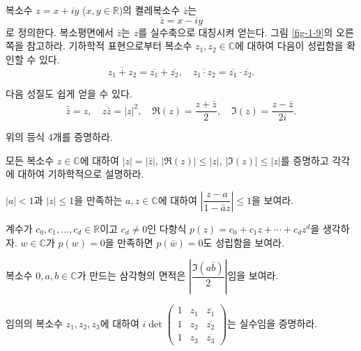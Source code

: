 복소수 $z=x+iy$ ($x,y\in\mathbb R$)의 켤레복소수 $\bar z$는
$$
\bar z = x - iy
$$
로 정의한다.
복소평면에서 $\bar z$는 $z$를 실수축으로 대칭시켜 얻는다.
그림 \ref{fig-1-9}의 오른쪽을 참고하라.
기하학적 표현으로부터 복소수 $z_1, z_2\in\mathbb C$에 대하여
다음이 성립함을 확인할 수 있다.
$$
\overline{z_1+z_2} = \overline{z_1} + \overline{z_2},
\quad
\overline{z_1\cdot z_2} = \overline{z_1} \cdot \overline{z_2}.
$$

다음 성질도 쉽게 얻을 수 있다.
$$
\bar{\bar z} = z, \quad z\bar z  = |z|^2, \quad
\Re(z) = \frac{z+\bar z}2, \quad \Im(z) = \frac{z-\bar z}{2i}.
$$

\begin{salt_exercise} \label{ex-1-15}
위의 등식 4개를 증명하라.
\end{salt_exercise}

\begin{salt_exercise} \label{ex-1-16}
모든 복소수 $z\in\mathbb C$에 대하여
$|z|=|\bar z|$, $|\Re(z)|\le |z|$, $|\Im(z)| \le |z|$를 증명하고
각각에 대하여 기하학적으로 설명하라.
\end{salt_exercise}

\begin{salt_exercise} \label{ex-1-17}
$|a|<1$과 $|z|\le 1$을 만족하는 $a,z\in\mathbb C$에 대하여
$\left| \dfrac{z-a}{1-\bar a z}\right| \le 1$을 보여라.
\end{salt_exercise}

\begin{salt_exercise} \label{ex-1-18}
계수가 $c_0, c_1, \ldots, c_d\in\mathbb R$이고 $c_d\ne0$인 다항식
$p(z) = c_0+c_1z+\cdots + c_dz^d$을 생각하자.
$w\in\mathbb C$가 $p(w)=0$을 만족하면 $p(\bar w)=0$도 성립함을 보여라.
\end{salt_exercise}

\begin{salt_exercise} \label{ex-1-19}
복소수 $0, a, b \in\mathbb C$가 만드는 삼각형의 면적은
$\left| \dfrac{\Im(a\bar b)}2\right|$임을 보여라.
\end{salt_exercise}

\begin{salt_exercise} \label{ex-1-20}
임의의 복소수 $z_1,z_2, z_3$에 대하여
$i\det \begin{pmatrix}
1 & z_1 & \overline{z_1} \\
1 & z_2 & \overline{z_2} \\
1 & z_3 & \overline{z_3} 
\end{pmatrix}$는 실수임을 증명하라.
\end{salt_exercise}


